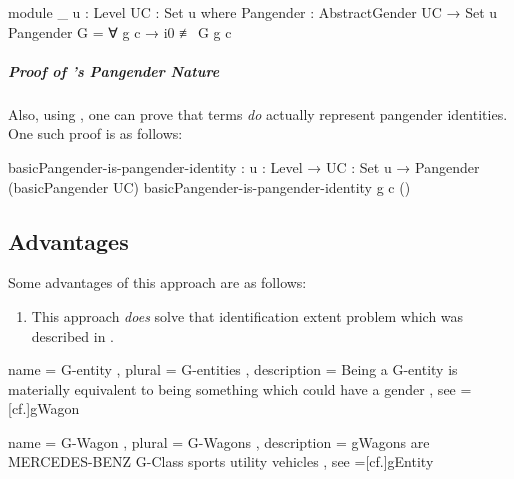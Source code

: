 \documentclass{article}
\theoremstyle{remark}
\begin{document}
\begin{code}
    module _ {u : Level} {UC : Set u} where
      Pangender : AbstractGender UC → Set u
      Pangender G = ∀ g c → i0 ≢ G g c
\end{code}

\subparagraph{Proof of 's Pangender Nature}
Also, using , one can prove that  terms \emph{do} actually represent pangender identities.  One such proof is as follows:

\begin{code}
    basicPangender-is-pangender-identity :
      {u : Level} → {UC : Set u} → Pangender (basicPangender UC)
    basicPangender-is-pangender-identity g c ()
\end{code}

\subsection{Advantages}
Some advantages of this approach are as follows:

\begin{enumerate}
  \item This approach \emph{does} solve that identification extent problem which was described in .\label{enum:gender8advantageExtent}
\end{enumerate}

\printbibliography{}

  { name = {G-entity}
  , plural = {G-entities}
  , description = Being a G-entity is materially equivalent to being something which could have a gender
  , see =[cf.]{gWagon}
  }

  { name = {G-Wagon}
  , plural = {G-Wagons}
  , description = \glspl{gWagon} are MERCEDES-BENZ G-Class sports utility vehicles
  , see =[cf.]{gEntity}
  }


\printglossary{}
\end{document}
